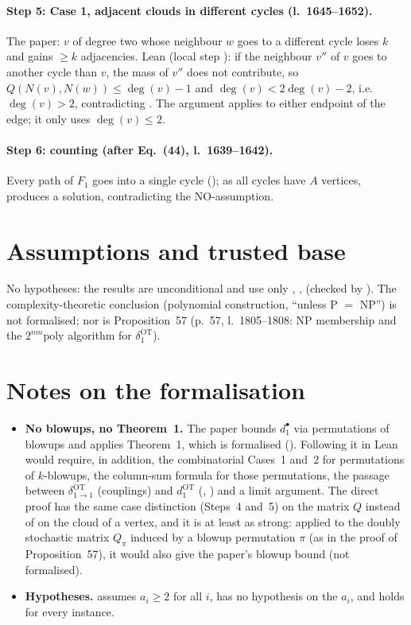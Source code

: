 \paragraph{Step 5: Case 1, adjacent clouds in different cycles (l.~1645--1652).} The paper: $v$ of degree
two whose neighbour $w$ goes to a different cycle loses $k$ and gains $\ge k$ adjacencies. Lean (local step
): if the neighbour $v''$ of $v$ goes to another cycle than $v$, the mass of $v''$ does not
contribute, so $Q(N(v),N(w))\le\deg(v)-1$ and $\deg(v)<2\deg(v)-2$, i.e.\ $\deg(v)>2$, contradicting
. The argument applies to either endpoint of the edge; it only uses
$\deg(v)\le2$.

\paragraph{Step 6: counting (after Eq.~(44), l.~1639--1642).} Every path of $F_1$ goes into a single cycle
(); as all cycles have $A$ vertices,  produces a solution,
contradicting the NO-assumption.

\section{Assumptions and trusted base}
No hypotheses: the results are unconditional and use only , ,
 (checked by ). The complexity-theoretic conclusion
(polynomial construction, ``unless P $=$ NP'') is not formalised; nor is Proposition~57 (p.~57,
l.~1805--1808: NP membership and the $2^{nm}\mathrm{poly}$ algorithm for $\delta^{\mathrm{OT}}_1$).

\section{Notes on the formalisation}
\begin{itemize}
\item \textbf{No blowups, no Theorem~1.} The paper bounds $d^{\bullet}_1$ via permutations of blowups and applies
  Theorem~1, which is formalised (). Following it in Lean would require, in addition,
  the combinatorial Cases~1 and~2 for permutations of $k$-blowups, the column-sum formula for those
  permutations, the passage between $\delta^{\mathrm{OT}}_{1\to1}$ (couplings) and $d^{\mathrm{OT}}_1$
  (, ) and a limit argument. The direct proof has the same
  case distinction (Steps~4 and~5) on the matrix $Q$ instead of on the cloud of a vertex, and it is at least as
  strong: applied to the doubly stochastic matrix $Q_\pi$ induced by a blowup permutation $\pi$ (as in the
  proof of Proposition~57), it would also give the paper's blowup bound (not formalised).
\item \textbf{Hypotheses.}  assumes $a_i\ge2$ for all $i$,
   has no hypothesis on the $a_i$, and  holds for
  every instance.
\end{itemize}

